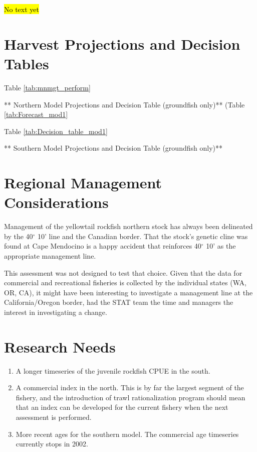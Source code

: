 \documentclass[12pt,]{article}
\begin{document}
\hl{No text yet}

\newpage

\section{Harvest Projections and Decision
Tables}\label{harvest-projections-and-decision-tables}

Table \ref{tab:mnmgt_perform}

** Northern Model Projections and Decision Table (groundfish only)**
(Table \ref{tab:Forecast_mod1}

Table \ref{tab:Decision_table_mod1}

** Southern Model Projections and Decision Table (groundfish only)**

\newpage

\section{Regional Management
Considerations}\label{regional-management-considerations}

Management of the yellowtail rockfish northern stock has always been
delineated by the 40\(^\circ\) 10' line and the Canadian border. That
the stock's genetic cline was found at Cape Mendocino is a happy
accident that reinforces 40\(^\circ\) 10' as the appropriate management
line.

This assessment was not designed to test that choice. Given that the
data for commercial and recreational fisheries is collected by the
individual states (WA, OR, CA), it might have been interesting to
investigate a management line at the California/Oregon border, had the
STAT team the time and managers the interest in investigating a change.

\newpage

\section{Research Needs}\label{research-needs}

\begin{enumerate}

\item A longer timeseries of the juvenile rockfish CPUE in the south.

\item A commercial index in the north.  This is by far the largest segment of the fishery, and the introduction of trawl rationalization program should mean that an index can be developed for the current fishery when the next assessment is performed.

\item More recent ages for the southern model.  The commercial age timeseries currently stops in 2002.

\end{enumerate}
\end{document}
